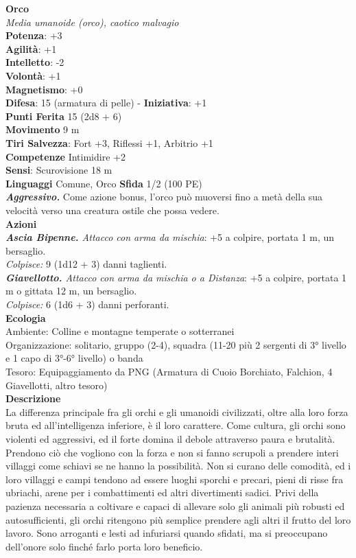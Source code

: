 \begin{multicols}{2}
\medskip\textbf{Orco}\\
\emph{Media umanoide (orco), caotico malvagio}\\
\textbf{Potenza}: +3\\
\textbf{Agilità}: +1\\
\textbf{Intelletto}: -2\\
\textbf{Volontà}: +1\\
\textbf{Magnetismo}: +0\\
\textbf{Difesa}: 15 (armatura di pelle) - \textbf{Iniziativa}: +1\\
\textbf{Punti Ferita} 15 (2d8 + 6)\\
\textbf{Movimento} 9 m\\
\textbf{Tiri Salvezza}: Fort +3, Riflessi +1, Arbitrio +1\\
\textbf{Competenze} Intimidire +2\\
\textbf{Sensi}: Scurovisione 18 m\\
\textbf{Linguaggi} Comune, Orco \textbf{Sfida} 1/2 (100 PE)\smallskip\\
\emph{\textbf{Aggressivo.}} Come azione bonus, l'orco può muoversi fino a metà della sua velocità verso una creatura ostile che possa vedere. \\
\smallskip\textbf{Azioni}\\
\emph{\textbf{Ascia Bipenne.} Attacco con arma da mischia}: +5 a colpire, portata 1 m, un bersaglio.\\
\emph{Colpisce:} 9 (1d12 + 3) danni taglienti.\\
\emph{\textbf{Giavellotto.} Attacco con arma da mischia o a Distanza}: +5 a colpire, portata 1 m o gittata 12 m, un bersaglio. \\
\emph{Colpisce:} 6 (1d6 + 3) danni perforanti.\\
\textbf{Ecologia}\\
Ambiente: Colline e montagne temperate o sotterranei\\
Organizzazione: solitario, gruppo (2-4), squadra (11-20 più 2 sergenti di 3° livello e 1 capo di 3°-6° livello) o banda \\
Tesoro: Equipaggiamento da PNG (Armatura di Cuoio Borchiato, Falchion, 4 Giavellotti, altro tesoro)\\
\textbf{Descrizione}\\
La differenza principale fra gli orchi e gli umanoidi civilizzati, oltre alla loro forza bruta ed all'intelligenza inferiore, è il loro carattere. Come cultura, gli orchi sono violenti ed aggressivi, ed il forte domina il debole attraverso paura e brutalità. Prendono ciò che vogliono con la forza e non si fanno scrupoli a prendere interi villaggi come schiavi se ne hanno la possibilità. Non si curano delle comodità, ed i loro villaggi e campi tendono ad essere luoghi sporchi e precari, pieni di risse fra ubriachi, arene per i combattimenti ed altri divertimenti sadici. Privi della pazienza necessaria a coltivare e capaci di allevare solo gli animali più robusti ed autosufficienti, gli orchi ritengono più semplice prendere agli altri il frutto del loro lavoro. Sono arroganti e lesti ad infuriarsi quando sfidati, ma si preoccupano dell’onore solo finché farlo porta loro beneficio.\\


\end{multicols}
